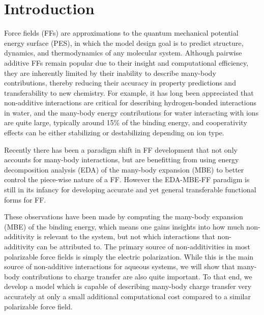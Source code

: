 \documentclass[journal=jacsat,manuscript=article]{achemso}
\begin{document}
\section{Introduction}
Force fields (FFs) are approximations to the quantum mechanical potential energy surface (PES), in which the model design goal is to predict structure, dynamics, and thermodynamics of any molecular system. Although pairwise additive FFs remain popular due to their insight and computational efficiency, they are inherently limited by their inability to describe many-body contributions, thereby reducing their accuracy in property predictions and transferability to new chemistry. For example, it has long been appreciated that non-additive interactions are critical for describing hydrogen-bonded interactions in water\cite{xantheas2000cooperativity}, and the many-body energy contributions for water interacting with ions are quite large, typically around 15\% of the binding energy, and cooperativity effects can be either stabilizing or destabilizing depending on ion type.\cite{heindel2021many,herman2021many}

Recently there has been a paradigm shift in FF development that not only accounts for many-body interactions, but are benefitting from using energy decomposition analysis (EDA) of the many-body expansion (MBE) to better control the piece-wise nature of a FF. However the EDA-MBE-FF paradigm is still in its infancy for developing accurate and yet general transferable functional forms for FF. 

These observations have been made by computing the many-body expansion (MBE) of
the binding energy\cite{heindel2020many}, which means one gains insights into how much non-additivity
is relevant to the system, but not which interactions that non-additivity can be
attributed to. The primary source of non-additivities in most polarizable force fields
is simply the electric polarization. While this is the main source of non-additive
interactions for aqueous systems, we will show that many-body contributions to charge
transfer are also quite important. To that end, we develop a model which is capable
of describing many-body charge transfer very accurately at only a small additional
computational cost compared to a similar polarizable force field.
\end{document}
